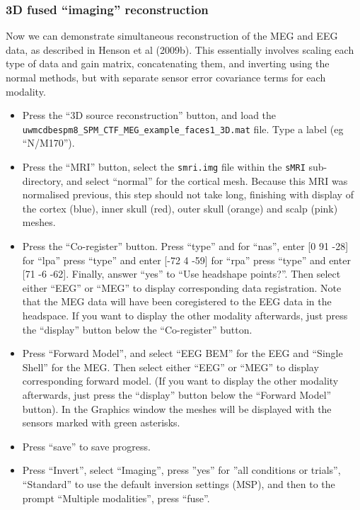 \subsubsection{3D fused ``imaging'' reconstruction \label{multimodal:fusion:eegmeg:3D}}

Now we can demonstrate simultaneous reconstruction of the MEG and EEG data, as described in Henson et al (2009b). This essentially involves scaling each type of data and gain matrix, concatenating them, and inverting using the normal methods, but with separate sensor error covariance terms for each modality.
\begin{itemize}
\item Press the ``3D source reconstruction'' button, and load the \texttt{uwmcdbespm8\_\-SPM\_\-CTF\_\-MEG\_\-example\_\-faces1\_\-3D.mat} file. Type a label (eg ``N/M170'').

\item Press the ``MRI'' button, select the \texttt{smri.img} file within the \texttt{sMRI} sub-directory, and select ``normal'' for the cortical mesh. Because this MRI was normalised previous, this step should not take long, finishing with display of the cortex (blue), inner skull (red), outer skull (orange) and scalp (pink) meshes.

\item Press the ``Co-register'' button. Press ``type'' and for ``nas'', enter [0 91 -28] for ``lpa'' press ``type'' and enter [-72 4 -59] for ``rpa'' press ``type'' and enter [71 -6 -62]. Finally, answer ``yes'' to ``Use headshape points?''. Then select either ``EEG'' or ``MEG'' to display corresponding
data registration. Note that the MEG data will have been coregistered to the EEG data in the headspace. If you want to display the other modality afterwards, just press the ``display'' button below the ``Co-register'' button.

\item Press ``Forward Model'', and select ``EEG BEM'' for the EEG and ``Single Shell'' for the MEG. Then select either ``EEG'' or ``MEG'' to display corresponding forward model. (If you want to display the other modality afterwards, just press the ``display'' button below the ``Forward Model'' button). In the Graphics window the meshes will be displayed with the sensors marked with green asterisks.

\item Press ``save'' to save progress.

\item Press ``Invert'', select ``Imaging'', press ''yes'' for ''all conditions or trials'', ``Standard'' to use the default inversion settings (MSP), and then to the prompt ``Multiple modalities'', press ``fuse''.


\end{itemize}
